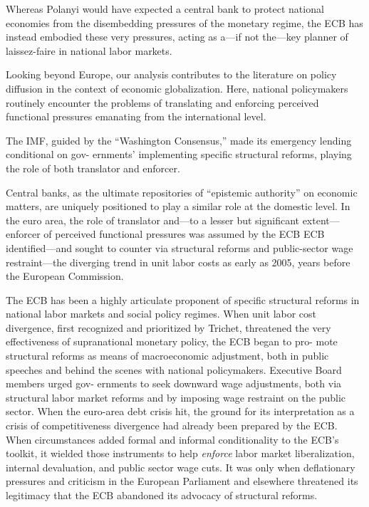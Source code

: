 \documentclass[
]{book}
\begin{document}
Whereas Polanyi would have
expected a central bank to protect national economies from the disembedding pressures
of the monetary regime, the ECB has instead embodied these very pressures, acting as
a---if not the---key planner of laissez-faire in national labor markets.

Looking beyond Europe, our analysis contributes to the literature on policy diffusion in
the context of economic globalization.
Here, national policymakers routinely encounter
the problems of translating and enforcing perceived functional pressures emanating from
the international level.

The IMF,
guided by the ``Washington Consensus,'' made its emergency lending conditional on gov-
ernments' implementing specific structural reforms, playing the role of both translator
and enforcer.

Central banks, as the ultimate repositories of ``epistemic authority'' on
economic matters, are uniquely positioned to play a similar role at the domestic level.
In the euro area, the role of translator and---to a lesser but significant
extent---enforcer of perceived functional pressures was assumed by the ECB
ECB identified---and sought to counter via structural reforms
and public-sector wage restraint---the diverging trend in unit labor costs
as early as 2005, years before the European Commission.

The ECB has been a highly articulate proponent of specific structural reforms
in national labor markets and social policy regimes.
When unit labor cost divergence, first recognized and prioritized by Trichet,
threatened the very effectiveness of supranational monetary policy, the ECB began to pro-
mote structural reforms as means of macroeconomic adjustment, both in public speeches
and behind the scenes with national policymakers.
Executive Board members urged gov-
ernments to seek downward wage adjustments, both via structural labor market reforms
and by imposing wage restraint on the public sector.
When the euro-area debt crisis hit,
the ground for its interpretation as a crisis of competitiveness divergence had already been
prepared by the ECB.
When circumstances added formal and informal conditionality to
the ECB's toolkit, it wielded those instruments to help \emph{enforce}
labor market liberalization, internal devaluation, and public sector wage cuts.
It was only when deflationary pressures
and criticism in the European Parliament and elsewhere threatened its legitimacy that
the ECB abandoned its advocacy of structural reforms.
\end{document}
